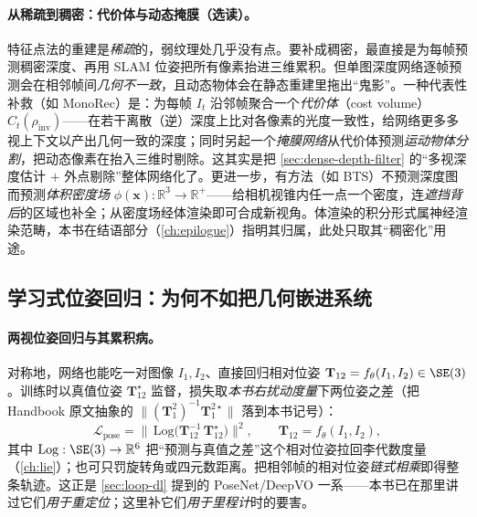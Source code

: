 \paragraph{从稀疏到稠密：代价体与动态掩膜（选读）。}
特征点法的重建是\emph{稀疏}的，弱纹理处几乎没有点。要补成稠密，最直接是为每帧预测稠密深度、再用 SLAM 位姿把所有像素抬进三维累积。但单图深度网络逐帧预测会在相邻帧间\emph{几何不一致}，且动态物体会在静态重建里拖出“鬼影”。一种代表性补救（如 MonoRec\cite{wimbauer2021monorec}）是：为每帧 $I_t$ 沿邻帧聚合一个\emph{代价体}（cost volume）$C_t(\rho_{\mathrm{inv}})$——在若干离散（逆）深度上比对各像素的光度一致性，给网络更多多视上下文以产出几何一致的深度；同时另起一个\emph{掩膜网络}从代价体预测\emph{运动物体分割}，把动态像素在抬入三维时剔除。这其实是把 \cref{sec:dense-depth-filter} 的“多视深度估计 $+$ 外点剔除”整体网络化了。更进一步，有方法（如 BTS）不预测深度图而预测\emph{体积密度场} $\phi(\mathbf{x}):\mathbb{R}^3\to\mathbb{R}^+$——给相机视锥内任一点一个密度，连\emph{遮挡背后}的区域也补全；从密度场经体渲染即可合成新视角。体渲染的积分形式属神经渲染范畴，本书在结语部分（\cref{ch:epilogue}）指明其归属，此处只取其“稠密化”用途。

\subsection{学习式位姿回归：为何不如把几何嵌进系统}
\label{sec:learning-pose}

\paragraph{两视位姿回归与其累积病。}
对称地，网络也能吃一对图像 $I_1,I_2$、直接回归相对位姿 $\mathbf{T}_{12}=f_\theta(I_1,I_2)\in\SE(3)$。训练时以真值位姿 $\mathbf{T}_{12}^\star$ 监督，损失取\emph{本书右扰动度量}下两位姿之差（把 Handbook 原文抽象的 $\|(\mathbf{T}_1^2)^{-1}\mathbf{T}_1^{2\star}\|$ 落到本书记号）：
\begin{equation}
  \mathcal{L}_{\mathrm{pose}}
  =\big\|\,\mathrm{Log}\!\big(\mathbf{T}_{12}^{-1}\,\mathbf{T}_{12}^{\star}\big)\big\|^2,
  \qquad \mathbf{T}_{12}=f_\theta(I_1,I_2),
  \label{eq:learn-pose-loss}
\end{equation}
其中 $\mathrm{Log}:\SE(3)\to\mathbb{R}^6$ 把“预测与真值之差”这个相对位姿拉回李代数度量（\cref{ch:lie}）；也可只罚旋转角或四元数距离。把相邻帧的相对位姿\emph{链式相乘}即得整条轨迹。这正是 \cref{sec:loop-dl} 提到的 PoseNet/DeepVO 一系——本书已在那里讲过它们\emph{用于重定位}；这里补它们\emph{用于里程计}时的要害。

